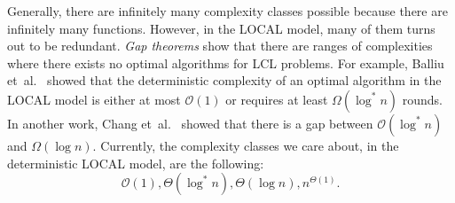Generally, there are infinitely many complexity classes possible because there are infinitely many functions.
However, in the LOCAL model, many of them turns out to be redundant.
\emph{Gap theorems} show that there are ranges of complexities where there exists no optimal algorithms for LCL problems.
For example, Balliu et~al.~\cite{DBLP:conf/podc/BalliuHOS19} showed that the deterministic complexity of an optimal algorithm in the LOCAL model is either at most \(\mathcal{O}(1)\) or requires at least \(\Omega(\log^* n)\) rounds.
In another work, Chang et~al.~\cite{DBLP:conf/focs/ChangKP16} showed that there is a gap between \(\mathcal{O}(\log^* n)\) and \(\Omega(\log n)\).
Currently, the complexity classes we care about, in the deterministic LOCAL model, are the following:
\[\mathcal{O}(1), \Theta(\log^* n), \Theta(\log n), n^{\Theta(1)}.\]

